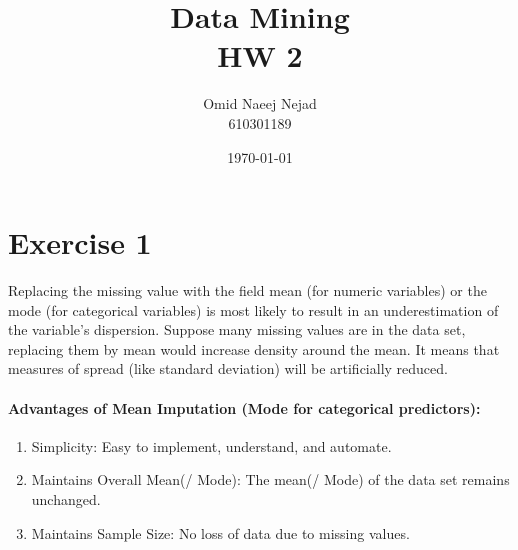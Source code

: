 \documentclass[12pt]{article}
\title{Data Mining \\ HW 2}
\date{\today}
\author{Omid Naeej Nejad \\ 610301189}
\begin{document}
	\maketitle
	\section{Exercise 1}	
		Replacing the missing value with the field mean (for numeric variables) or the
		mode (for categorical variables) is most likely to result in an underestimation of the variable’s dispersion. Suppose many missing values are in the data set, replacing them by mean would increase density around the mean. It means that measures of spread (like standard deviation) will be artificially reduced.
		
		\paragraph{Advantages of Mean Imputation (Mode for categorical predictors):}
		\begin{enumerate}
			\item Simplicity: Easy to implement, understand, and automate.						
			\item Maintains Overall Mean(/ Mode): The mean(/ Mode) of the data set remains unchanged.
			\item Maintains Sample Size: No loss of data due to missing values.
		\end{enumerate}
		
	
\end{document}
